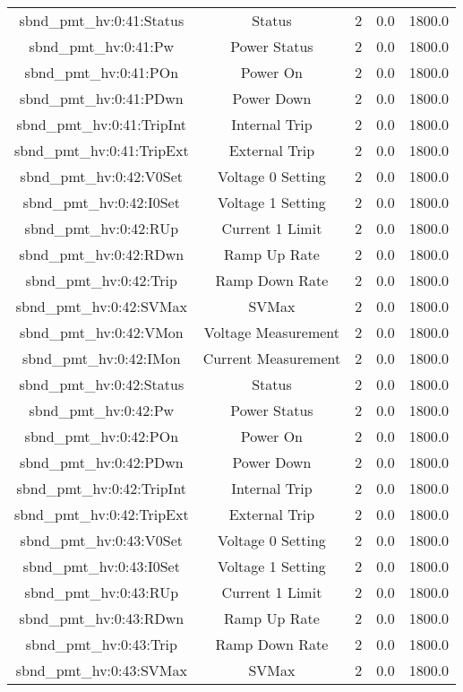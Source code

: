 \begin{center}
\begin{longtable}{c | c c c c }
sbnd\_pmt\_hv:0:41:Status & Status & 2 & 0.0 & 1800.0\\ 
sbnd\_pmt\_hv:0:41:Pw & Power Status & 2 & 0.0 & 1800.0\\ 
sbnd\_pmt\_hv:0:41:POn & Power On & 2 & 0.0 & 1800.0\\ 
sbnd\_pmt\_hv:0:41:PDwn & Power Down & 2 & 0.0 & 1800.0\\ 
sbnd\_pmt\_hv:0:41:TripInt & Internal Trip & 2 & 0.0 & 1800.0\\ 
sbnd\_pmt\_hv:0:41:TripExt & External Trip & 2 & 0.0 & 1800.0\\ 
sbnd\_pmt\_hv:0:42:V0Set & Voltage 0 Setting & 2 & 0.0 & 1800.0\\ 
sbnd\_pmt\_hv:0:42:I0Set & Voltage 1 Setting & 2 & 0.0 & 1800.0\\ 
sbnd\_pmt\_hv:0:42:RUp & Current 1 Limit & 2 & 0.0 & 1800.0\\ 
sbnd\_pmt\_hv:0:42:RDwn & Ramp Up Rate & 2 & 0.0 & 1800.0\\ 
sbnd\_pmt\_hv:0:42:Trip & Ramp Down Rate & 2 & 0.0 & 1800.0\\ 
sbnd\_pmt\_hv:0:42:SVMax & SVMax & 2 & 0.0 & 1800.0\\ 
sbnd\_pmt\_hv:0:42:VMon & Voltage Measurement & 2 & 0.0 & 1800.0\\ 
sbnd\_pmt\_hv:0:42:IMon & Current Measurement & 2 & 0.0 & 1800.0\\ 
sbnd\_pmt\_hv:0:42:Status & Status & 2 & 0.0 & 1800.0\\ 
sbnd\_pmt\_hv:0:42:Pw & Power Status & 2 & 0.0 & 1800.0\\ 
sbnd\_pmt\_hv:0:42:POn & Power On & 2 & 0.0 & 1800.0\\ 
sbnd\_pmt\_hv:0:42:PDwn & Power Down & 2 & 0.0 & 1800.0\\ 
sbnd\_pmt\_hv:0:42:TripInt & Internal Trip & 2 & 0.0 & 1800.0\\ 
sbnd\_pmt\_hv:0:42:TripExt & External Trip & 2 & 0.0 & 1800.0\\ 
sbnd\_pmt\_hv:0:43:V0Set & Voltage 0 Setting & 2 & 0.0 & 1800.0\\ 
sbnd\_pmt\_hv:0:43:I0Set & Voltage 1 Setting & 2 & 0.0 & 1800.0\\ 
sbnd\_pmt\_hv:0:43:RUp & Current 1 Limit & 2 & 0.0 & 1800.0\\ 
sbnd\_pmt\_hv:0:43:RDwn & Ramp Up Rate & 2 & 0.0 & 1800.0\\ 
sbnd\_pmt\_hv:0:43:Trip & Ramp Down Rate & 2 & 0.0 & 1800.0\\ 
sbnd\_pmt\_hv:0:43:SVMax & SVMax & 2 & 0.0 & 1800.0\\ 

\end{longtable}
\end{center}
